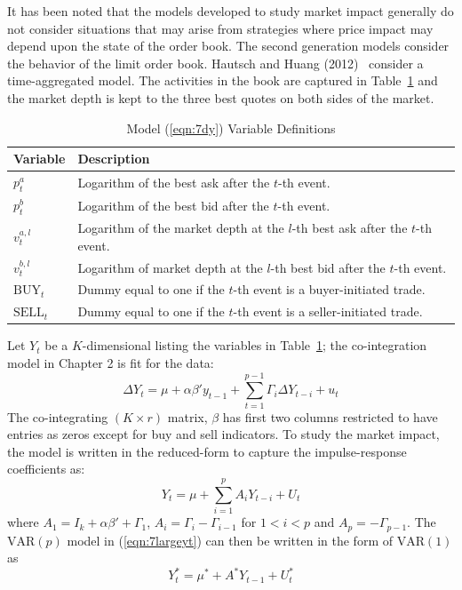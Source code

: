 It has been noted that the models developed to study market impact generally do not consider situations that may arise from strategies where price impact may depend upon the state of the order book. The second generation models consider the behavior of the limit order book. Hautsch and Huang (2012)~\cite{hauthuang} consider a time-aggregated model. The activities in the book are captured in Table~\ref{tab:vardef} and the market depth is kept to the three best quotes on both sides of the market.
	\begin{table}[!ht]
	\centering
	\caption{Model (\ref{eqn:7dy}) Variable Definitions \label{tab:vardef}}
	\begin{tabular}{ll}
	Variable & Description \\ \hline
	$p_t^a$ & Logarithm of the best ask after the $t$-th event. \\
	$p_t^b$ & Logarithm of the best bid after the $t$-th event. \\
	$v_t^{a,l}$ & Logarithm of the market depth at the $l$-th best ask after the $t$-th event. \\
	$v_t^{b,l}$ & Logarithm of market depth at the $l$-th best bid after the $t$-th event. \\
	$\text{BUY}_t$ & Dummy equal to one if the $t$-th event is a buyer-initiated trade. \\
	$\text{SELL}_t$ & Dummy equal to one if the $t$-th event is a seller-initiated trade. 
	\end{tabular} 
	\end{table}
Let $Y_t$ be a $K$-dimensional listing the variables in Table~\ref{tab:vardef}; the co-integration model in Chapter 2 is fit for the data:
	\begin{equation} \label{eqn:7dy}
	\Delta Y_t = \mu + \alpha \beta' y_{t-1} + \sum_{t=1}^{p-1} \Gamma_i \Delta Y_{t-i} + u_t
	\end{equation}
The co-integrating $(K \times r)$ matrix, $\beta$ has first two columns restricted to have entries as zeros except for buy and sell indicators. To study the market impact, the model is written in the reduced-form to capture the impulse-response coefficients as:
	\begin{equation}\label{eqn:7largeyt}
	Y_t = \mu + \sum_{i=1}^p A_i Y_{t-i} + U_t
	\end{equation}
where $A_1=I_k+\alpha\beta' + \Gamma_1$, $A_i=\Gamma_i - \Gamma_{i-1}$ for $1<i<p$ and $A_p= -\Gamma_{p-1}$. The $\text{VAR}(p)$ model in (\ref{eqn:7largeyt}) can then be written in the form of $\text{VAR}(1)$ as 
	\begin{equation}\label{eqn:starlargeyt}
	Y_t^*= \mu^* + A^* Y_{t-1} + U_t^*
	\end{equation}

